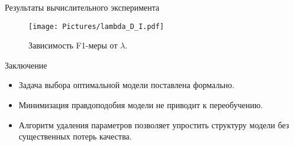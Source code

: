 \documentclass{beamer}
\begin{document}
\begin{frame}{Результаты вычислительного эксперимента}
	
\begin{figure}
	\texttt{[image: Pictures/lambda\_D\_I.pdf]}
	\caption{Зависимость F1-меры от $\lambda$.}
\end{figure}
	
\end{frame}


\begin{frame}{Заключение}

\begin{itemize}
\item Задача выбора оптимальной модели поставлена формально.
\item Минимизация правдоподобия модели не приводит к переобучению.
\item Алгоритм удаления параметров позволяет упростить структуру модели без существенных потерь качества.
\end{itemize}

\end{frame}
\end{document}
